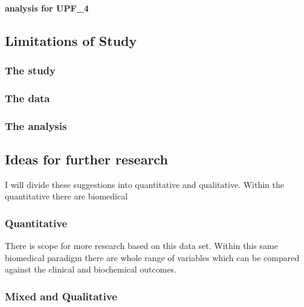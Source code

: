 \documentclass[
]{article}
\begin{document}
\hypertarget{analysis-for-upf_4}{%
\paragraph{analysis for UPF\_4}\label{analysis-for-upf_4}}

\hypertarget{limitations-of-study}{%
\subsection{Limitations of Study}\label{limitations-of-study}}

\hypertarget{the-study}{%
\subsubsection{The study}\label{the-study}}

\hypertarget{the-data}{%
\subsubsection{The data}\label{the-data}}

\hypertarget{the-analysis}{%
\subsubsection{The analysis}\label{the-analysis}}

\hypertarget{ideas-for-further-research}{%
\subsection{Ideas for further
research}\label{ideas-for-further-research}}

I will divide these suggestions into quantitative and qualitative.
Within the quantitative there are biomedical

\hypertarget{quantitative}{%
\subsubsection{Quantitative}\label{quantitative}}

There is scope for more research based on this data set. Within this
same biomedical paradigm there are whole range of variables which can be
compared against the clinical and biochemical outcomes.

\hypertarget{mixed-and-qualitative}{%
\subsubsection{Mixed and Qualitative}\label{mixed-and-qualitative}}
\end{document}
